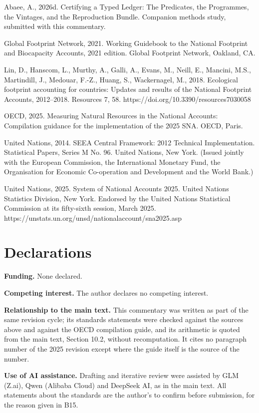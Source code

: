 \documentclass[11pt]{article}
\begin{document}
Abaee, A., 2026d. Certifying a Typed Ledger: The Predicates, the Programmes, the Vintages, and the Reproduction Bundle. Companion methods study, submitted with this commentary.

Global Footprint Network, 2021. Working Guidebook to the National Footprint and Biocapacity Accounts, 2021 edition. Global Footprint Network, Oakland, CA.

Lin, D., Hanscom, L., Murthy, A., Galli, A., Evans, M., Neill, E., Mancini, M.S., Martindill, J., Medouar, F.-Z., Huang, S., Wackernagel, M., 2018. Ecological footprint accounting for countries: Updates and results of the National Footprint Accounts, 2012--2018. Resources 7, 58. https://doi.org/10.3390/resources7030058

OECD, 2025. Measuring Natural Resources in the National Accounts: Compilation guidance for the implementation of the 2025 SNA. OECD, Paris.

United Nations, 2014. SEEA Central Framework: 2012 Technical Implementation. Statistical Papers, Series M No. 96. United Nations, New York. (Issued jointly with the European Commission, the International Monetary Fund, the Organisation for Economic Co-operation and Development and the World Bank.)

United Nations, 2025. System of National Accounts 2025. United Nations Statistics Division, New York. Endorsed by the United Nations Statistical Commission at its fifty-sixth session, March 2025. https://unstats.un.org/unsd/nationalaccount/sna2025.asp

\vspace{0.8em}

\section*{Declarations}\label{declarations}

\textbf{Funding.} None declared.

\textbf{Competing interest.} The author declares no competing interest.

\textbf{Relationship to the main text.} This commentary was written as part of the same revision cycle; its standards statements were checked against the sources above and against the OECD compilation guide, and its arithmetic is quoted from the main text, Section 10.2, without recomputation. It cites no paragraph number of the 2025 revision except where the guide itself is the source of the number.

\textbf{Use of AI assistance.} Drafting and iterative review were assisted by GLM (Z.ai), Qwen (Alibaba Cloud) and DeepSeek AI, as in the main text. All statements about the standards are the author's to confirm before submission, for the reason given in B15.
\end{document}
